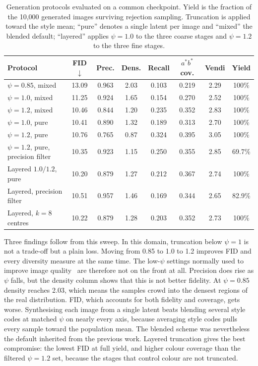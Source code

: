 \documentclass[electronics,article,submit,pdftex,moreauthors]{Definitions/mdpi}
\begin{document}
\begin{table}[H]
\caption{Generation protocols evaluated on a common checkpoint. Yield is the
fraction of the 10,000 generated images surviving rejection sampling.
Truncation is applied toward the style mean; ``pure'' denotes a single latent
per image and ``mixed'' the blended default; ``layered'' applies $\psi = 1.0$
to the three coarse stages and $\psi = 1.2$ to the three fine stages.}
\label{tab:protocols}
\setlength{\tabcolsep}{4pt}
\begin{tabular}{lccccccc}
\toprule
\textbf{Protocol} & \textbf{FID} $\downarrow$ & \textbf{Prec.} &
\textbf{Dens.} & \textbf{Recall} & \textbf{$a^*b^*$ cov.} &
\textbf{Vendi} & \textbf{Yield} \\
\midrule
$\psi = 0.85$, mixed                 & 13.09 & 0.963 & 2.03 & 0.103 & 0.219 & 2.29 & 100\% \\
$\psi = 1.0$, mixed                  & 11.25 & 0.924 & 1.65 & 0.154 & 0.270 & 2.52 & 100\% \\
$\psi = 1.2$, mixed                  & 10.46 & 0.844 & 1.20 & 0.235 & 0.352 & 2.83 & 100\% \\
$\psi = 1.0$, pure                   & 10.41 & 0.890 & 1.32 & 0.189 & 0.313 & 2.70 & 100\% \\
$\psi = 1.2$, pure                   & 10.76 & 0.765 & 0.87 & 0.324 & 0.395 & 3.05 & 100\% \\
$\psi = 1.2$, pure, precision filter & 10.35 & 0.923 & 1.15 & 0.250 & 0.355 & 2.85 & 69.7\% \\
Layered $1.0/1.2$, pure              & 10.20 & 0.879 & 1.27 & 0.212 & 0.367 & 2.74 & 100\% \\
Layered, precision filter            & 10.51 & 0.957 & 1.46 & 0.169 & 0.344 & 2.65 & 82.9\% \\
Layered, $k = 8$ centres             & 10.22 & 0.879 & 1.28 & 0.203 & 0.352 & 2.73 & 100\% \\
\bottomrule
\end{tabular}
\end{table}

Three findings follow from this sweep. In this domain, truncation below
$\psi = 1$ is not a trade-off but a plain loss. Moving from 0.85 to 1.0 to
1.2 improves FID and every diversity measure at the same time. The low-$\psi$
settings normally used to improve image
quality~\cite{brock2019biggan,karras2019stylegan} are therefore not on the
front at all. Precision does rise as $\psi$ falls, but the density column
shows that this is not better fidelity. At $\psi = 0.85$ density reaches
2.03, which means the samples crowd into the densest regions of the real
distribution. FID, which accounts for both fidelity and coverage, gets worse.
Synthesising each image from a single latent beats blending several style
codes at matched $\psi$ on nearly every axis, because averaging style codes
pulls every sample toward the population mean. The blended scheme was
nevertheless the default inherited from the previous work. Layered truncation
gives the best compromise: the lowest FID at full yield, and higher colour
coverage than the filtered $\psi = 1.2$ set, because the stages that control
colour are not truncated.
\end{document}
